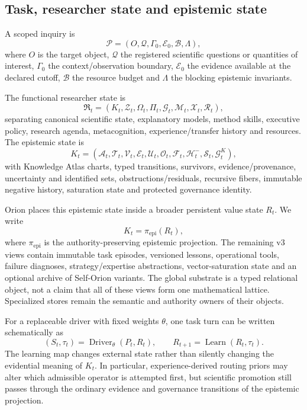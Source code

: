 \subsection{Task, researcher state and epistemic state}
A scoped inquiry is
\begin{equation}\mathcal P=(O,\mathcal Q,\Gamma_0,\mathcal E_0,\mathcal B,\Lambda),\end{equation}
where $O$ is the target object, $\mathcal Q$ the registered scientific questions or quantities of interest, $\Gamma_0$ the context/observation boundary, $\mathcal E_0$ the evidence available at the declared cutoff, $\mathcal B$ the resource budget and $\Lambda$ the blocking epistemic invariants.

The functional researcher state is
\begin{equation}\mathfrak R_t=(K_t,\mathcal Z_t,\Omega_t,\Pi_t,\mathcal G_t,\mathcal M_t,\mathcal X_t,\mathcal R_t),\end{equation}
separating canonical scientific state, explanatory models, method skills, executive policy, research agenda, metacognition, experience/transfer history and resources. The epistemic state is
\begin{equation}K_t=(\mathcal A_t,\mathcal T_t,\mathcal V_t,\mathcal E_t,\mathcal U_t,\mathcal O_t,\mathcal F_t,\mathcal H_t^{-},\mathcal S_t,\mathcal G_t^K),\end{equation}
with Knowledge Atlas charts, typed transitions, survivors, evidence/provenance, uncertainty and identified sets, obstructions/residuals, recursive fibers, immutable negative history, saturation state and protected governance identity.


Orion places this epistemic state inside a broader persistent value state $R_t$. We write
\begin{equation}
K_t=\pi_{\mathrm{epi}}(R_t),
\end{equation}
where $\pi_{\mathrm{epi}}$ is the authority-preserving epistemic projection. The remaining v3 views contain immutable task episodes, versioned lessons, operational tools, failure diagnoses, strategy/expertise abstractions, vector-saturation state and an optional archive of Self-Orion variants. The global substrate is a typed relational object, not a claim that all of these views form one mathematical lattice. Specialized stores remain the semantic and authority owners of their objects.

For a replaceable driver with fixed weights $\theta$, one task turn can be written schematically as
\begin{equation}
(S_t,\tau_t)=\operatorname{Driver}_{\theta}(P_t,R_t),
\qquad
R_{t+1}=\operatorname{Learn}(R_t,\tau_t).
\end{equation}
The learning map changes external state rather than silently changing the evidential meaning of $K_t$. In particular, experience-derived routing priors may alter which admissible operator is attempted first, but scientific promotion still passes through the ordinary evidence and governance transitions of the epistemic projection.

